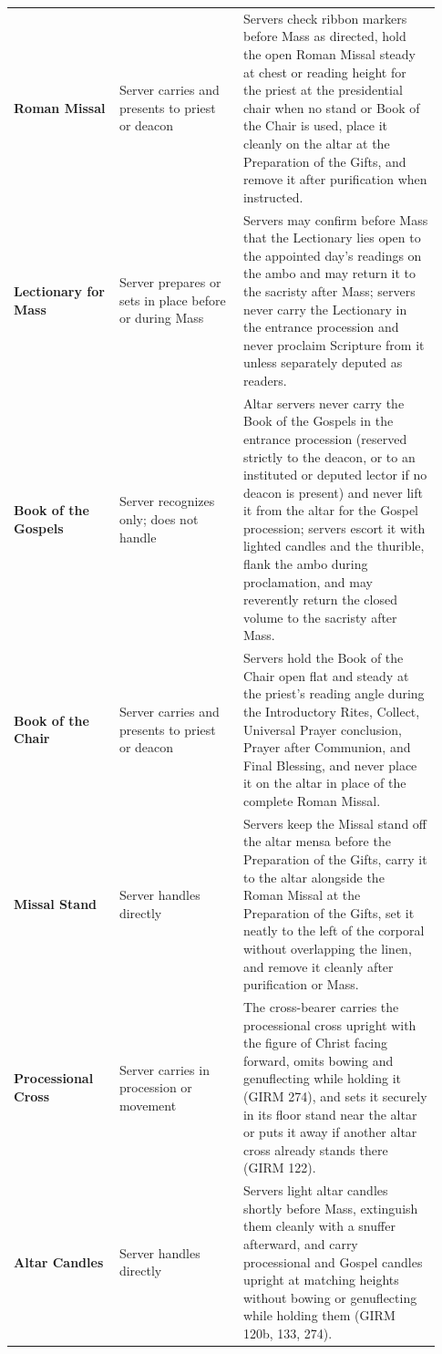{\begin{longtable}{>{\raggedright\arraybackslash}p{0.23\linewidth}>{\raggedright\arraybackslash}p{0.27\linewidth}>{\raggedright\arraybackslash}p{0.43\linewidth}}
\textbf{Roman Missal} & Server carries and presents to priest or deacon & Servers check ribbon markers before Mass as directed, hold the open Roman Missal steady at chest or reading height for the priest at the presidential chair when no stand or Book of the Chair is used, place it cleanly on the altar at the Preparation of the Gifts, and remove it after purification when instructed. \\
\textbf{Lectionary for Mass} & Server prepares or sets in place before or during Mass & Servers may confirm before Mass that the Lectionary lies open to the appointed day's readings on the ambo and may return it to the sacristy after Mass; servers never carry the Lectionary in the entrance procession and never proclaim Scripture from it unless separately deputed as readers. \\
\textbf{Book of the Gospels} & Server recognizes only; does not handle & Altar servers never carry the Book of the Gospels in the entrance procession (reserved strictly to the deacon, or to an instituted or deputed lector if no deacon is present) and never lift it from the altar for the Gospel procession; servers escort it with lighted candles and the thurible, flank the ambo during proclamation, and may reverently return the closed volume to the sacristy after Mass. \\
\textbf{Book of the Chair} & Server carries and presents to priest or deacon & Servers hold the Book of the Chair open flat and steady at the priest's reading angle during the Introductory Rites, Collect, Universal Prayer conclusion, Prayer after Communion, and Final Blessing, and never place it on the altar in place of the complete Roman Missal. \\
\textbf{Missal Stand} & Server handles directly & Servers keep the Missal stand off the altar mensa before the Preparation of the Gifts, carry it to the altar alongside the Roman Missal at the Preparation of the Gifts, set it neatly to the left of the corporal without overlapping the linen, and remove it cleanly after purification or Mass. \\
\textbf{Processional Cross} & Server carries in procession or movement & The cross-bearer carries the processional cross upright with the figure of Christ facing forward, omits bowing and genuflecting while holding it (GIRM 274), and sets it securely in its floor stand near the altar or puts it away if another altar cross already stands there (GIRM 122). \\
\textbf{Altar Candles} & Server handles directly & Servers light altar candles shortly before Mass, extinguish them cleanly with a snuffer afterward, and carry processional and Gospel candles upright at matching heights without bowing or genuflecting while holding them (GIRM 120b, 133, 274). \\

\end{longtable}}
